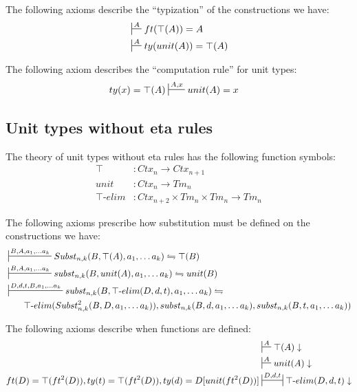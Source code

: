 \documentclass{amsart}
\theoremstyle{definition}
\theoremstyle{remark}
\numberwithin{figure}{section}
\begin{document}
The following axioms describe the ``typization'' of the constructions we have:
\begin{align*}
& \sststile{}{A} ft(\top(A)) = A \\
& \sststile{}{A} ty(unit(A)) = \top(A)
\end{align*}

The following axiom describes the ``computation rule'' for unit types:
\begin{align*}
ty(x) = \top(A) & \sststile{}{A,x} unit(A) = x
\end{align*}

\subsection{Unit types without eta rules}
The theory of unit types without eta rules has the following function symbols:
\begin{align*}
\top             & : Ctx_n \to Ctx_{n+1} \\
unit             & : Ctx_n \to Tm_n \\
\top\text{-}elim & : Ctx_{n+2} \times Tm_n \times Tm_n \to Tm_n
\end{align*}

The following axioms prescribe how substitution must be defined on the constructions we have:
\begin{align*}
& \sststile{}{B, A, a_1, \ldots a_k} Subst_{n,k}(B, \top(A), a_1, \ldots a_k) \leftrightharpoons \top(B) \\
& \sststile{}{B, A, a_1, \ldots a_k} subst_{n,k}(B, unit(A), a_1, \ldots a_k) \leftrightharpoons unit(B) \\
& \sststile{}{D, d, t, B, a_1, \ldots a_k} subst_{n,k}(B, \top\text{-}elim(D, d, t), a_1, \ldots a_k) \leftrightharpoons \\
& \qquad \top\text{-}elim(Subst^2_{n,k}(B, D, a_1, \ldots a_k)), subst_{n,k}(B, d, a_1, \ldots a_k), subst_{n,k}(B, t, a_1, \ldots a_k))
\end{align*}

The following axioms describe when functions are defined:
\begin{align*}
& \sststile{}{A} \top(A) \downarrow \\
& \sststile{}{A} unit(A) \downarrow \\
ft(D) = \top(ft^2(D)), ty(t) = \top(ft^2(D)), ty(d) = D[unit(ft^2(D))] & \ssststile{}{D, d, t} \top\text{-}elim(D, d, t) \downarrow
\end{align*}
\end{document}
